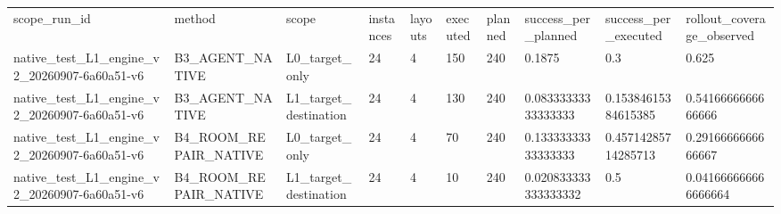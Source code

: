 \begin{tabular}{llllllllll}
scope\_run\_id & method & scope & instances & layouts & executed & planned & success\_per\_planned & success\_per\_executed & rollout\_coverage\_observed \\
native\_test\_L1\_engine\_v2\_20260907-6a60a51-v6 & B3\_AGENT\_NATIVE & L0\_target\_only & 24 & 4 & 150 & 240 & 0.1875 & 0.3 & 0.625 \\
native\_test\_L1\_engine\_v2\_20260907-6a60a51-v6 & B3\_AGENT\_NATIVE & L1\_target\_destination & 24 & 4 & 130 & 240 & 0.08333333333333333 & 0.15384615384615385 & 0.5416666666666666 \\
native\_test\_L1\_engine\_v2\_20260907-6a60a51-v6 & B4\_ROOM\_REPAIR\_NATIVE & L0\_target\_only & 24 & 4 & 70 & 240 & 0.13333333333333333 & 0.45714285714285713 & 0.2916666666666667 \\
native\_test\_L1\_engine\_v2\_20260907-6a60a51-v6 & B4\_ROOM\_REPAIR\_NATIVE & L1\_target\_destination & 24 & 4 & 10 & 240 & 0.020833333333333332 & 0.5 & 0.041666666666666664 \\
\end{tabular}
